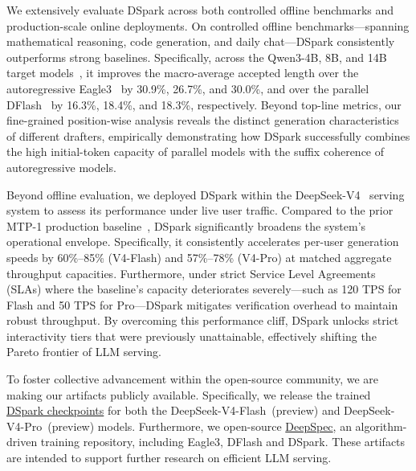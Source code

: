 We extensively evaluate DSpark across both controlled offline benchmarks and production-scale online deployments.
On controlled offline benchmarks—spanning mathematical reasoning, code generation, and daily chat—DSpark consistently outperforms strong baselines. Specifically, across the Qwen3-4B, 8B, and 14B target models~\citep{yang2025qwen3}, it improves the macro-average accepted length over the autoregressive Eagle3~\citep{li2026eagle} by 30.9\%, 26.7\%, and 30.0\%, and over the parallel DFlash~\citep{chen2026dflash} by 16.3\%, 18.4\%, and 18.3\%, respectively. Beyond top-line metrics, our fine-grained position-wise analysis reveals the distinct generation characteristics of different drafters, empirically demonstrating how DSpark successfully combines the high initial-token capacity of parallel models with the suffix coherence of autoregressive models.

Beyond offline evaluation, we deployed DSpark within the DeepSeek-V4~\citep{deepseekai2026deepseekv4highlyefficientmilliontoken} serving system to assess its performance under live user traffic. Compared to the prior MTP-1 production baseline~\citep{liu2024deepseek}, DSpark significantly broadens the system's operational envelope. Specifically, it consistently accelerates per-user generation speeds by 60\%--85\% (V4-Flash) and 57\%--78\% (V4-Pro) at matched aggregate throughput capacities. 
Furthermore, under strict Service Level Agreements (SLAs) where the baseline's capacity deteriorates severely—such as 120 TPS for Flash and 50 TPS for Pro—DSpark mitigates verification overhead to maintain robust throughput. By overcoming this performance cliff, DSpark unlocks strict interactivity tiers that were previously unattainable, effectively shifting the Pareto frontier of LLM serving.

To foster collective advancement within the open-source community, we are making our artifacts publicly available. Specifically, we release the trained \href{https://huggingface.co/deepseek-ai/DeepSeek-V4-Pro-DSpark/tree/main}{DSpark checkpoints} for both the DeepSeek-V4-Flash~(preview) and DeepSeek-V4-Pro~(preview) models. Furthermore, we open-source \href{https://github.com/deepseek-ai/DeepSpec}{DeepSpec}, an algorithm-driven training repository, including Eagle3, DFlash and DSpark. 
These artifacts are intended to support further research on efficient LLM serving.